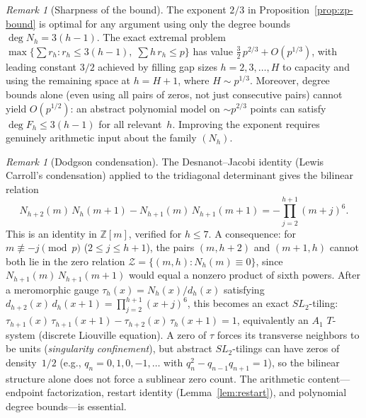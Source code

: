 \documentclass[11pt]{article}
\theoremstyle{definition}
\theoremstyle{remark}
\newtheorem{remark}[theorem]{Remark}
\begin{document}
\begin{remark}[Sharpness of the bound]\label{rem:sharp}
The exponent $2/3$ in Proposition~\ref{prop:zp-bound}
is optimal for any argument using only the degree bounds
$\deg N_h = 3(h-1)$.
The exact extremal problem
$\max\bigl\{\sum r_h : r_h \le 3(h{-}1),\;
\sum h\,r_h \le p\bigr\}$
has value $\frac{3}{2}\,p^{2/3} + O(p^{1/3})$, with
leading constant $3/2$ achieved by filling gap sizes
$h = 2, 3, \ldots, H$ to capacity and using the
remaining space at $h = H+1$, where $H \sim p^{1/3}$.
Moreover, degree bounds alone (even using all pairs
of zeros, not just consecutive pairs) cannot yield
$O(p^{1/2})$: an abstract polynomial model on
$\sim p^{2/3}$ points can satisfy
$\deg F_h \le 3(h-1)$ for all relevant~$h$.
Improving the exponent requires genuinely arithmetic
input about the family $(N_h)$.
\end{remark}

\begin{remark}[Dodgson condensation]\label{rem:dodgson}
The Desnanot--Jacobi identity (Lewis Carroll's condensation)
applied to the tridiagonal determinant gives the bilinear relation
\begin{equation}\label{eq:dodgson}
N_{h+2}(m)\,N_h(m{+}1) - N_{h+1}(m)\,N_{h+1}(m{+}1)
= -\prod_{j=2}^{h+1} (m{+}j)^6.
\end{equation}
This is an identity in $\mathbb{Z}[m]$, verified for $h \le 7$.
A consequence: for $m \not\equiv -j \pmod{p}$
($2 \le j \le h{+}1$), the pairs $(m, h{+}2)$ and
$(m{+}1, h)$ cannot both lie in the zero relation
$\mathcal{Z} = \{(m,h) : N_h(m) \equiv 0\}$, since
$N_{h+1}(m)\,N_{h+1}(m{+}1)$ would equal a nonzero
product of sixth powers.
After a meromorphic gauge $\tau_h(x) = N_h(x)/d_h(x)$
satisfying $d_{h+2}(x)\,d_h(x{+}1) = \prod_{j=2}^{h+1}(x{+}j)^6$,
this becomes an exact $SL_2$-tiling:
$\tau_{h+1}(x)\,\tau_{h+1}(x{+}1)
- \tau_{h+2}(x)\,\tau_h(x{+}1) = 1$,
equivalently an $A_1$ $T$-system (discrete Liouville equation).
A zero of $\tau$ forces its transverse neighbors to be units
(\emph{singularity confinement}), but abstract $SL_2$-tilings
can have zeros of density~$1/2$ (e.g., $q_n = 0, 1, 0, -1, \ldots$
with $q_n^2 - q_{n-1}q_{n+1} = 1$),
so the bilinear structure alone does not force a sublinear zero count.
The arithmetic content---endpoint factorization,
restart identity (Lemma~\ref{lem:restart}), and polynomial
degree bounds---is essential.
\end{remark}
\end{document}
